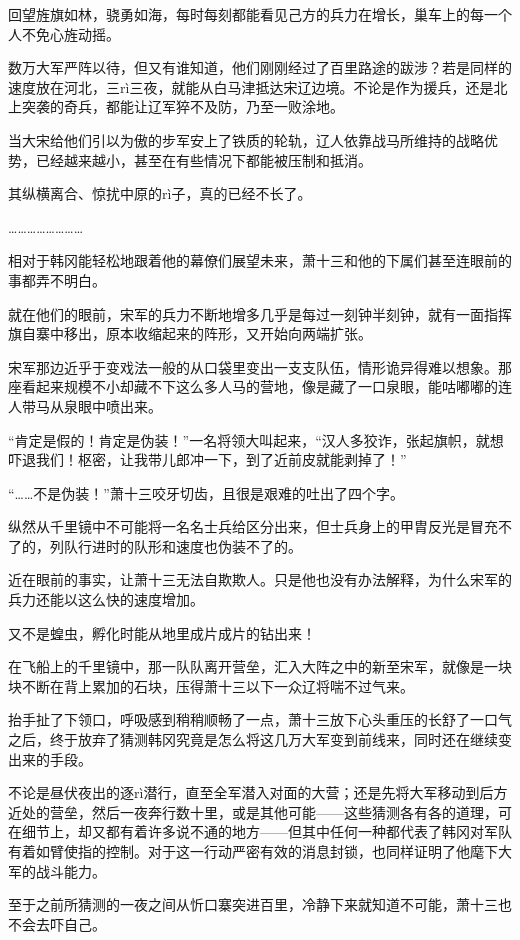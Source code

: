回望旌旗如林，骁勇如海，每时每刻都能看见己方的兵力在增长，巢车上的每一个人不免心旌动摇。

数万大军严阵以待，但又有谁知道，他们刚刚经过了百里路途的跋涉？若是同样的速度放在河北，三rì三夜，就能从白马津抵达宋辽边境。不论是作为援兵，还是北上突袭的奇兵，都能让辽军猝不及防，乃至一败涂地。

当大宋给他们引以为傲的步军安上了铁质的轮轨，辽人依靠战马所维持的战略优势，已经越来越小，甚至在有些情况下都能被压制和抵消。

其纵横离合、惊扰中原的rì子，真的已经不长了。

……………………

相对于韩冈能轻松地跟着他的幕僚们展望未来，萧十三和他的下属们甚至连眼前的事都弄不明白。

就在他们的眼前，宋军的兵力不断地增多几乎是每过一刻钟半刻钟，就有一面指挥旗自寨中移出，原本收缩起来的阵形，又开始向两端扩张。

宋军那边近乎于变戏法一般的从口袋里变出一支支队伍，情形诡异得难以想象。那座看起来规模不小却藏不下这么多人马的营地，像是藏了一口泉眼，能咕嘟嘟的连人带马从泉眼中喷出来。

“肯定是假的！肯定是伪装！”一名将领大叫起来，“汉人多狡诈，张起旗帜，就想吓退我们！枢密，让我带儿郎冲一下，到了近前皮就能剥掉了！”

“……不是伪装！”萧十三咬牙切齿，且很是艰难的吐出了四个字。

纵然从千里镜中不可能将一名名士兵给区分出来，但士兵身上的甲胄反光是冒充不了的，列队行进时的队形和速度也伪装不了的。

近在眼前的事实，让萧十三无法自欺欺人。只是他也没有办法解释，为什么宋军的兵力还能以这么快的速度增加。

又不是蝗虫，孵化时能从地里成片成片的钻出来！

在飞船上的千里镜中，那一队队离开营垒，汇入大阵之中的新至宋军，就像是一块块不断在背上累加的石块，压得萧十三以下一众辽将喘不过气来。

抬手扯了下领口，呼吸感到稍稍顺畅了一点，萧十三放下心头重压的长舒了一口气之后，终于放弃了猜测韩冈究竟是怎么将这几万大军变到前线来，同时还在继续变出来的手段。

不论是昼伏夜出的逐rì潜行，直至全军潜入对面的大营；还是先将大军移动到后方近处的营垒，然后一夜奔行数十里，或是其他可能——这些猜测各有各的道理，可在细节上，却又都有着许多说不通的地方——但其中任何一种都代表了韩冈对军队有着如臂使指的控制。对于这一行动严密有效的消息封锁，也同样证明了他麾下大军的战斗能力。

至于之前所猜测的一夜之间从忻口寨突进百里，冷静下来就知道不可能，萧十三也不会去吓自己。


